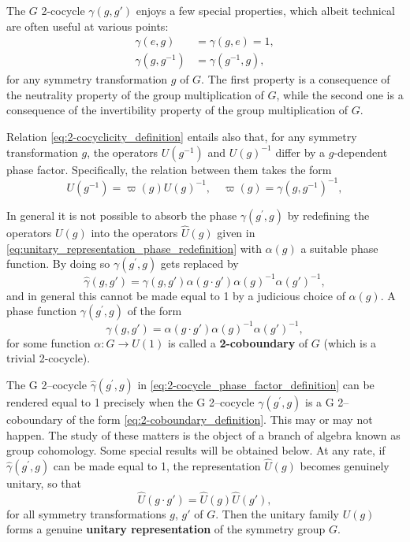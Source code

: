 The \(G\) 2-cocycle \(\gamma(g, g')\) enjoys a few special properties, which albeit technical are often useful at various points:
\begin{equation}
    \begin{aligned}
        \gamma(e, g)      & = \gamma(g, e) = 1,  \\
        \gamma(g, g^{-1}) & = \gamma(g^{-1}, g),
    \end{aligned}
    \label{eq:2-cocycles_properties}
\end{equation}
for any symmetry transformation \(g\) of \(G\). The first property is a consequence of the neutrality property of the group multiplication of \(G\), while the second one is a consequence of the invertibility property of the group multiplication of \(G\).

Relation \eqref{eq:2-cocyclicity_definition} entails also that, for any symmetry transformation \(g\), the operators \(U(g^{-1})\) and \(U(g)^{-1}\) differ by a \(g\)-dependent phase factor. Specifically, the relation between them takes the form
\[
    U(g^{-1}) = \varpi(g) U(g)^{-1}, \quad \varpi(g) = \gamma(g, g^{-1})^{-1},
\]

In general it is not possible to absorb the phase \(\gamma(g^{\prime},g)\) by redefining the operators \(U(g)\) into the operators \(\hat{U}(g)\) given in \eqref{eq:unitary_representation_phase_redefinition} with \(\alpha(g)\) a suitable phase function. By doing so \(\gamma(g^{\prime},g)\) gets replaced by
\begin{equation}
    \hat{\gamma}(g, g') = \gamma(g, g') \alpha(g \cdot g') \alpha(g)^{-1} \alpha(g')^{-1},
    \label{eq:2-cocycle_phase_factor_definition}
\end{equation}
and in general this cannot be made equal to 1 by a judicious choice of \(\alpha(g)\). A phase function \(\gamma(g^{\prime},g)\) of the form
\begin{equation}
    \gamma(g, g') = \alpha(g \cdot g') \alpha(g)^{-1} \alpha(g')^{-1},
    \label{eq:2-coboundary_definition}
\end{equation}
for some function \(\alpha : G \to U(1)\) is called a \textbf{2-coboundary} of \(G\) (which is a trivial 2-cocycle).

The G 2–cocycle \(\hat{\gamma}(g^{\prime},g)\) in \eqref{eq:2-cocycle_phase_factor_definition} can be rendered equal to 1 precisely when the G 2–cocycle \(\gamma(g^{\prime},g)\) is a G 2–coboundary of the form \eqref{eq:2-coboundary_definition}. This may or may not happen. The study of these matters is the object of a branch of algebra known as group cohomology. Some special results will be obtained below. At any rate, if \(\hat{\gamma}(g^{\prime},g)\) can be made equal to 1, the representation \(\hat{U}(g)\) becomes
genuinely unitary, so that
\[
    \hat{U} (g \cdot g') = \hat{U}(g) \hat{U}(g'),
\]
for all symmetry transformations \(g\), \(g'\) of \(G\). Then the unitary family \(U(g)\) forms a genuine \textbf{unitary representation} of the symmetry group \(G\).


